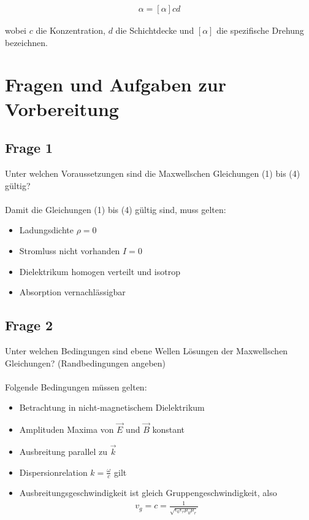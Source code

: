 \documentclass[a4paper,10pt]{scrartcl}
\begin{document}
			\begin{align}
			\alpha=[\alpha]cd
			\end{align} 
			
			wobei \(c\) die Konzentration, \(d\) die Schichtdecke und \([\alpha]\) die spezifische Drehung bezeichnen.
			
			\newpage
			
	\section{Fragen und Aufgaben zur Vorbereitung}
		\subsection{Frage 1}
			Unter welchen Voraussetzungen sind die Maxwellschen Gleichungen (1) bis (4) gültig?\\
			\\
			Damit die Gleichungen (1) bis (4) gültig sind, muss gelten:
			
			\begin{itemize}
				\item Ladungsdichte \(\rho=0\)
				\item Stromluss nicht vorhanden \(I=0\)
				\item Dielektrikum homogen verteilt und isotrop
				\item Absorption vernachlässigbar
			\end{itemize}
			
		\subsection{Frage 2}
			Unter welchen Bedingungen sind ebene Wellen Lösungen der Maxwellschen Gleichungen?
			(Randbedingungen angeben)\\
			\\
			Folgende Bedingungen müssen gelten:
		
			\begin{itemize}
				\item Betrachtung in nicht-magnetischem Dielektrikum
				\item Amplituden Maxima von \(\vec{E}\) und \(\vec{B}\) konstant
				\item Ausbreitung parallel zu \(\vec{k}\)
				\item Dispersionrelation \(k=\frac{\omega}{c}\) gilt
				\item Ausbreitungsgeschwindigkeit ist gleich Gruppengeschwindigkeit, also\\
				\begin{align*}
				v_{g}=c=\frac{1}{\sqrt{\epsilon_{0}\epsilon_{r}\mu_{0}\mu_{r}}}
				\end{align*}
			\end{itemize}
		
\end{document}
